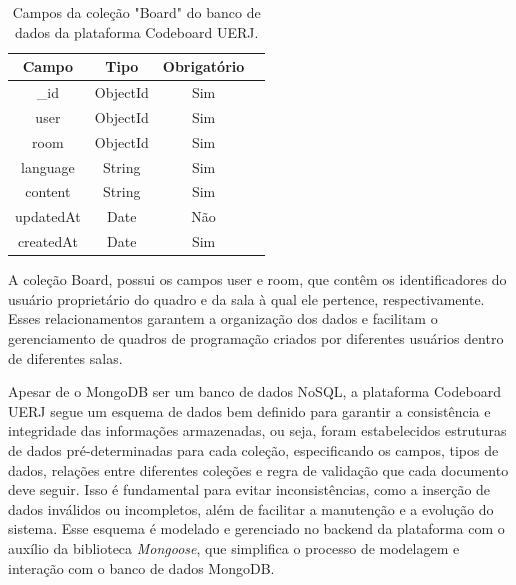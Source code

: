\begin{table}[H]
    \centering
    \renewcommand{\arraystretch}{1.3} 
    \begin{tabular}{|c|c|c|c|}
        \hline
        \textbf{Campo}             & \textbf{Tipo} & \textbf{Obrigatório} \\
        \hline
        \_id             & ObjectId      & Sim                  \\
        \hline
        user          & ObjectId      & Sim                  \\
        \hline
        room          & ObjectId      & Sim                  \\
        \hline
        language           & String        & Sim                  \\
        \hline
        content                 & String        & Sim                  \\
        \hline
        updatedAt         & Date          & Não                  \\
        \hline
        createdAt          & Date          & Sim                  \\
        \hline
    \end{tabular}
    \caption{Campos da coleção "Board" do banco de dados da plataforma Codeboard UERJ.}
    \label{tab:board-collection-fields}
\end{table}

A coleção Board, possui os campos user e room, que contêm os identificadores do usuário proprietário do quadro e da sala à qual ele pertence, respectivamente. Esses relacionamentos garantem a organização dos dados e facilitam o gerenciamento de quadros de programação criados por diferentes usuários dentro de diferentes salas.

Apesar de o MongoDB ser um banco de dados NoSQL, a plataforma Codeboard UERJ segue um esquema de dados bem definido para garantir a consistência e integridade das informações armazenadas, ou seja, foram estabelecidos estruturas de dados pré-determinadas para cada coleção, especificando os campos, tipos de dados, relações entre diferentes coleções e regra de validação que cada documento deve seguir. Isso é fundamental para evitar inconsistências, como a inserção de dados inválidos ou incompletos, além de facilitar a manutenção e a evolução do sistema. Esse esquema é modelado e gerenciado no backend da plataforma com o auxílio da biblioteca \emph{Mongoose}, que simplifica o processo de modelagem e interação com o banco de dados MongoDB.


